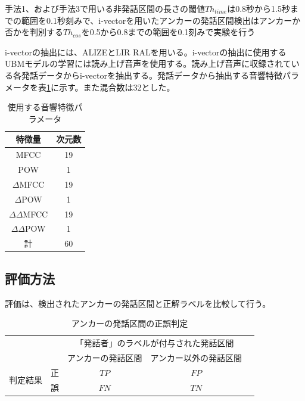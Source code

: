 手法1、および手法3で用いる非発話区間の長さの閾値$Th_{time}$は0.8秒から1.5秒までの範囲を0.1秒刻みで、i-vectorを用いたアンカーの発話区間検出はアンカーか否かを判別する$Th_{cos}$を0.5から0.8までの範囲を0.1刻みで実験を行う\par
i-vectorの抽出には、ALIZEとLIR RALを用いる。i-vectorの抽出に使用するUBMモデルの学習には読み上げ音声\cite{ATR}を使用する。読み上げ音声に収録されている各発話データからi-vectorを抽出する。発話データから抽出する音響特徴パラメータを表\ref{iv_feature2}に示す。また混合数は32とした。\par

\begin{table}[H]
  \begin{center}
    \caption{使用する音響特徴パラメータ \label{iv_feature2}}
    \begin{tabular}{|c||c|} \hline
      特徴量 & 次元数\\ \hline
      MFCC & 19  \\ 
      POW & 1  \\ 
      $\Delta$MFCC & 19 \\ 
      $\Delta$POW & 1 \\ 
      $\Delta\Delta$MFCC & 19 \\ 
      $\Delta\Delta$POW & 1 \\ \hline
      計 & 60 \\ \hline
    \end{tabular}
  \end{center}
\end{table}

\subsection{評価方法}
評価は、検出されたアンカーの発話区間と正解ラベルを比較して行う。

\begin{table}[H]
\begin{center}
    \caption{アンカーの発話区間の正誤判定 \label{table:clustering}}
\begin{tabular}{|c|c|c|c|l}
\cline{1-4}
\multicolumn{2}{|c|}{\multirow{2}{*}{}} & \multicolumn{2}{c|}{「発話者」のラベルが付与された発話区間} &  \\ \cline{3-4}
\multicolumn{2}{|c|}{}                  & アンカーの発話区間        & アンカー以外の発話区間        &  \\ \cline{1-4}
\multirow{2}{*}{判定結果}        & 正        & $TP$                  & $FP$                   &  \\ \cline{2-4}
& 誤        & $FN$                  & $TN$                   &  \\ \cline{1-4}
\end{tabular}
\end{center}
\end{table}

